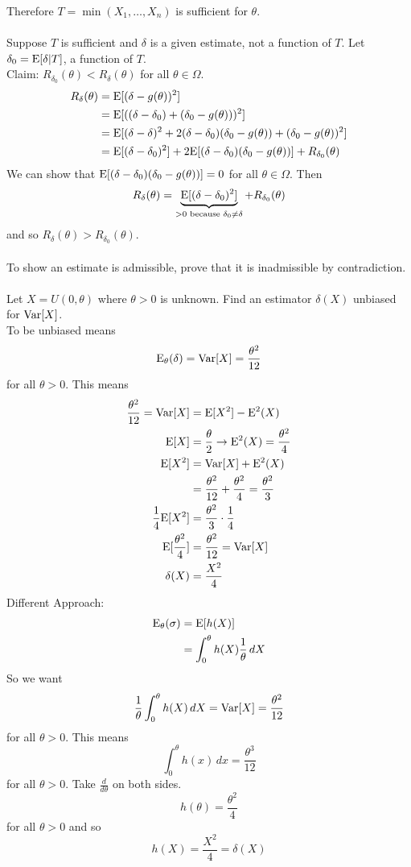 \documentclass[12pt]{article}
\begin{document}
Therefore $T = \min(X_1,\dots,X_n)$ is sufficient for $\theta$. \\~\\
Suppose $T$ is sufficient and $\delta$ is a given estimate, not a function of $T$. Let $\delta_0 = \mathrm{E}[ \delta | T ]$, a function of $T$. \\Claim: $R_{\delta_0}(\theta) < R_\delta(\theta)$ for all $\theta \in \Omega$. $$ \begin{aligned} R_\delta(\theta) &= \mathrm{E}[ (\delta - g(\theta))^2 ] \\ &= \mathrm{E}[ ((\delta - \delta_0) + (\delta_0 - g(\theta)))^2 ] \\ &= \mathrm{E}[ (\delta - \delta)^2 + 2(\delta - \delta_0)(\delta_0 - g(\theta)) + (\delta_0 - g(\theta))^2 ] \\ &= \mathrm{E}[ (\delta - \delta_0)^2 ] + 2\mathrm{E}[ (\delta - \delta_0)(\delta_0 - g(\theta)) ] + R_{\delta_0}(\theta) \end{aligned} $$ 
We can show that $\mathrm{E}[ (\delta - \delta_0)(\delta_0 - g(\theta)) ] = 0$ for all $\theta \in \Omega$. Then $$R_\delta(\theta) = \underbrace{\mathrm{E}[ (\delta - \delta_0)^2 ]}_{> 0 \text{ because } \delta_0 \neq \delta} + R_{\delta_0}(\theta) $$ 
and so $R_\delta(\theta) > R_{\delta_0}(\theta)$. \\~\\
To show an estimate is admissible, prove that it is inadmissible by contradiction. \\~\\
Let $X = U(0,\theta)$ where $\theta > 0$ is unknown. Find an estimator $\delta(X)$ unbiased for $\mathrm{Var}[ X ]$. \\
To be unbiased means $$\mathrm{E}_\theta(\delta) = \mathrm{Var}[ X ] = \frac{\theta^2}{12}$$ for all $\theta > 0$. This means $$ \begin{aligned} \frac{\theta^2}{12} = \mathrm{Var}[ X ] &= \mathrm{E}[ X^2 ] - \mathrm{E}^2(X) \\ 
\mathrm{E}[ X ] &= \frac{\theta}{2} \to \mathrm{E}^2(X) = \frac{\theta^2}{4} \\ \mathrm{E}[ X^2 ] &= \mathrm{Var}[ X ] + \mathrm{E}^2(X) \\ &= \frac{\theta^2}{12} + \frac{\theta^2}{4} = \frac{\theta^2}{3} \\ \frac{1}{4} \mathrm{E}[ X^2 ] &= \frac{\theta^2}{3} \cdot \frac{1}{4} \\ \mathrm{E}[ \frac{\theta^2}{4} ] &= \frac{\theta^2}{12} = \mathrm{Var}[ X ] \\ \delta(X) &= \frac{X^2}{4} \end{aligned} $$ 
Different Approach: $$ \begin{aligned} \mathrm{E}_\theta(\sigma) &= \mathrm{E}[ h(X) ] \\ &= \int_0^\theta h(X) \frac{1}{\theta} \, dX \end{aligned} $$ So we want $$\frac{1}{\theta} \int_0^\theta h(X) \, dX = \mathrm{Var}[ X ] = \frac{\theta^2}{12} $$ for all $\theta > 0$. This means $$ \int_0^\theta h(x) \, dx = \frac{\theta^3}{12} $$ for all $\theta > 0$. Take $\frac{d}{d\theta}$ on both sides. $$h(\theta) = \frac{\theta^2}{4} $$ for all $\theta > 0$ and so $$h(X) = \frac{X^2}{4} = \delta(X)$$ 
\end{document}
